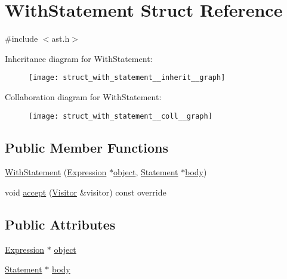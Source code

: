 \hypertarget{struct_with_statement}{}\section{With\+Statement Struct Reference}
\label{struct_with_statement}


{\ttfamily \#include $<$ast.\+h$>$}



Inheritance diagram for With\+Statement\+:
\nopagebreak
\begin{figure}[H]
\begin{center}
\leavevmode
\texttt{[image: struct\_with\_statement\_\_inherit\_\_graph]}
\end{center}
\end{figure}


Collaboration diagram for With\+Statement\+:
\nopagebreak
\begin{figure}[H]
\begin{center}
\leavevmode
\texttt{[image: struct\_with\_statement\_\_coll\_\_graph]}
\end{center}
\end{figure}
\subsection*{Public Member Functions}
\begin{DoxyCompactItemize}
\item 
\hyperlink{struct_with_statement_a30feda3f34febbab2584ea274fcd507d}{With\+Statement} (\hyperlink{struct_expression}{Expression} $\ast$\hyperlink{struct_with_statement_a1563aab5799cbe5112e7a0429f4956bd}{object}, \hyperlink{struct_statement}{Statement} $\ast$\hyperlink{struct_with_statement_af7976ff82c99c995f603c2d32e8122ff}{body})
\item 
void \hyperlink{struct_with_statement_a07d3015de8ea5d3f27a0bab8719665f3}{accept} (\hyperlink{struct_visitor}{Visitor} \&visitor) const override
\end{DoxyCompactItemize}
\subsection*{Public Attributes}
\begin{DoxyCompactItemize}
\item 
\hyperlink{struct_expression}{Expression} $\ast$ \hyperlink{struct_with_statement_a1563aab5799cbe5112e7a0429f4956bd}{object}
\item 
\hyperlink{struct_statement}{Statement} $\ast$ \hyperlink{struct_with_statement_af7976ff82c99c995f603c2d32e8122ff}{body}
\end{DoxyCompactItemize}


